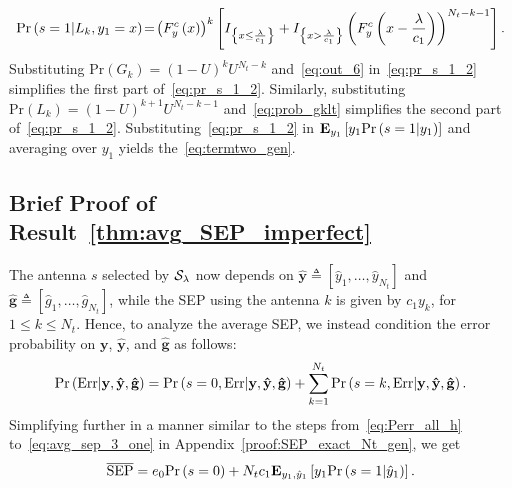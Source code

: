 \documentclass[12pt,draftcls,peerreview,onecolumn]{IEEEtran}
\newcommand{\brac}[1]{\left({#1}\right)}
\newcommand{\cbrac}[1]{\left\{{#1}\right\}}
\newcommand{\indic}[1]{I_{\cbrac{#1}}}
\newcommand{\define}{\triangleq}
\newcommand{\explow}[2]{{\bf{E}}_{#1}\left[{#2}\right]}
\newcommand{\prob}[1]{\text{Pr}\brac{#1}}
\newcommand{\given}{\arrowvert}
\newcommand{\SEP}{\text{SEP}}
\newcommand{\y}{\mathbf{y}}
\newcommand{\nx}{{0}}
\newcommand{\setG}{G}
\newcommand{\setL}{L}
\newcommand{\setGk}{\setG_k}
\newcommand{\setLk}{\setL_k}
\newcommand{\lam}{\lambda}
\newcommand{\Err}{{\text{Err}}}
\newcommand{\Nt}{{N_t}}
\newcommand{\puch}{g}
\newcommand{\ghatvec}{\mathbf{\hat{\puch}}}
\newcommand{\yhatvec}{\mathbf{\hat{y}}}
\newcommand{\cone}{c_{1}}
\newcommand{\lambym}{\frac{\lam}{\cone}}
\newcommand{\yk}[1]{y_{#1}}
\newcommand{\un}{U}
\newcommand{\zerosep}{e_0}
\newcommand{\callamrule}{{\cal S_{{\lam}}}}
\newcommand{\avgSEP}{\overline{\SEP}}
\newcommand{\ghat}{\hat{\puch}}
\newcommand{\gkhat}[1]{\ghat_{#1}}
\newcommand{\ykhat}[1]{\hat{y}_{#1}}
\begin{document}
\begin{equation}
\text{Pr}\brac{s =1\given \setLk,\yk{1}=x} \!=\! \left( F_{y}^{c}\brac{x}\right)^{k}\left[\indic{x\leq\lambym} +\indic{x>\lambym}\left( F_{y}^{c}\brac{x-\lambym}\right) ^{\Nt-k-1}\right].
\label{eq:prob_gklt}
\end{equation}
%
Substituting $\prob{\setGk} = \left(1-\un\right)^k\un^{\Nt-k}$ and~\eqref{eq:out_6} in~\eqref{eq:pr_s_1_2} simplifies the first part of~\eqref{eq:pr_s_1_2}. Similarly, substituting $\prob{\setLk}=\left(1-\un\right)^{k+1}\un^{\Nt-k-1}$ and~\eqref{eq:prob_gklt} simplifies the second part of~\eqref{eq:pr_s_1_2}. Substituting~\eqref{eq:pr_s_1_2} in $\explow{\yk{1}}{ \yk{1}\prob{s = 1\given \yk{1}}}$ and averaging over $\yk{1}$ yields the~\eqref{eq:termtwo_gen}. 


\subsection{Brief Proof of Result~\ref{thm:avg_SEP_imperfect}}
\label{proof:avg_SEP_imperfect_CSI}
The antenna $s$ selected by $\callamrule$  now depends on $\yhatvec\define\left[\ykhat{1},\ldots,\ykhat{\Nt} \right]$ and $\ghatvec\define\left[\gkhat{1},\ldots,\gkhat{\Nt} \right]$, while the SEP using the antenna $k$ is given by $\cone\yk{k}$, for $1\leq k\leq\Nt$.  Hence, to analyze the average SEP, we instead condition the error probability on $\y$, $\yhatvec$, and $\ghatvec$ as follows:
%
\begin{equation}
\prob{\Err \given \y,\yhatvec,\ghatvec} =  \prob{s=\nx,\Err\given \y, \yhatvec,\ghatvec} + \sum_{k=1}^{\Nt}\prob{s=k,\Err\given\y,\yhatvec,\ghatvec}.
\label{eq:Perr_all_imp_csi}
\end{equation}  
%
Simplifying further in a manner similar to the steps from~\eqref{eq:Perr_all_h} to~\eqref{eq:avg_sep_3_one} in Appendix~\ref{proof:SEP_exact_Nt_gen}, we get
%
\begin{equation}
\label{eq:avg_SEP_3_IMP_CSI}
\avgSEP = \zerosep \prob{s=\nx} + \Nt\cone\explow{\yk{1},\ykhat{1}}{\yk{1}\prob{s=1\given \ykhat{1}}}.
\end{equation}
%
\end{document}
